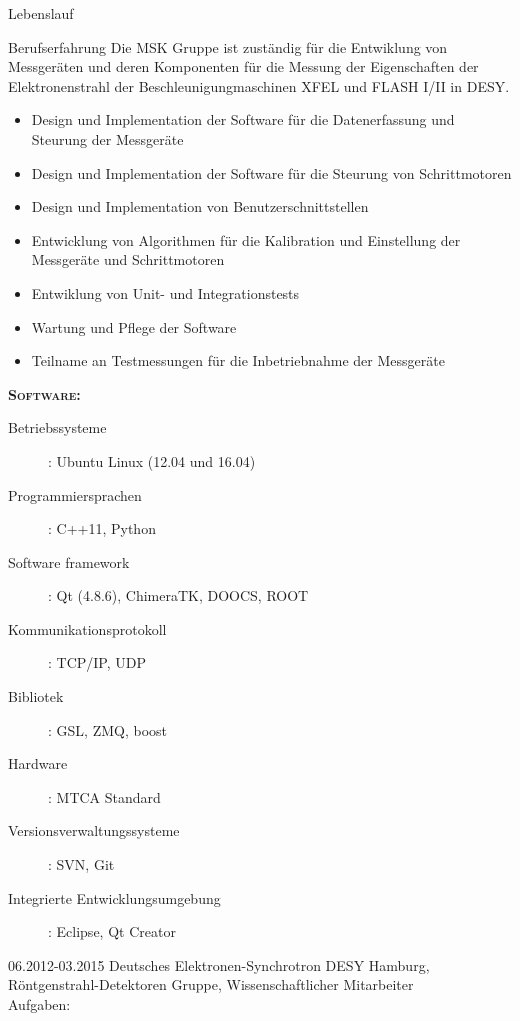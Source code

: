 \documentclass[11pt,a4paper]{scrartcl}
\begin{document}
\begin{cv}{Lebenslauf}
\begin{cvlist}{Berufserfahrung}
Die MSK Gruppe ist zust{\"a}ndig f{\"u}r die Entwiklung von Messger{\"a}ten und
deren Komponenten f{\"u}r die Messung der Eigenschaften der Elektronenstrahl der
Beschleunigungmaschinen XFEL und FLASH I/II in DESY.
\begin{itemize}
  \item Design und Implementation der Software f{\"u}r die Datenerfassung und
  Steurung der Messger{\"a}te
  \item Design und Implementation der Software f{\"u}r die Steurung von
  Schrittmotoren
  \item Design und Implementation von Benutzerschnittstellen
  \item Entwicklung von Algorithmen f{\"u}r die Kalibration und
  Einstellung der Messger{\"a}te und Schrittmotoren
  \item Entwiklung von Unit- und Integrationstests
  \item Wartung und Pflege der Software
  \item Teilname an Testmessungen f{\"u}r die Inbetriebnahme der Messger{\"a}te
\end{itemize}
{\scshape {\bfseries Software:}}
\begin{description}
\item[Betriebssysteme] : Ubuntu Linux (12.04 und 16.04)
\item[Programmiersprachen] : C++11, Python
\item[Software framework] : Qt (4.8.6), ChimeraTK, DOOCS, ROOT
\item[Kommunikationsprotokoll] : TCP/IP, UDP
\item[Bibliotek] : GSL, ZMQ, boost
\item[Hardware] : MTCA Standard
\item[Versionsverwaltungssysteme] : SVN, Git
\item[Integrierte Entwicklungsumgebung] : Eclipse, Qt Creator
\end{description}

\vspace{\baselineskip}

\item[06.2012-03.2015] Deutsches Elektronen-Synchrotron DESY Hamburg,
R{\"o}ntgenstrahl-Detektoren Gruppe, Wissenschaftlicher Mitarbeiter\\

Aufgaben:\\


\end{cvlist}
\end{cv}
\end{document}
